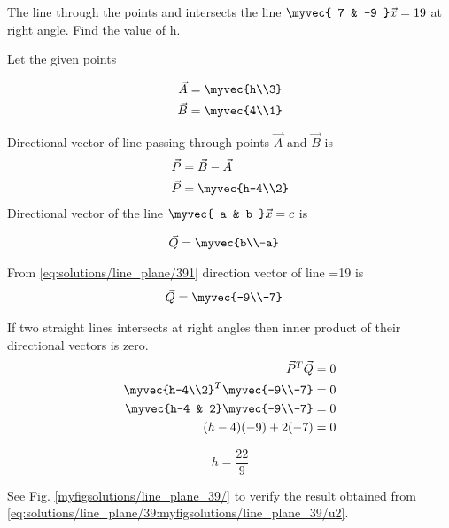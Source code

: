  The line through the points  and 
intersects the line $\myvec{ 7 & -9 }\vec{x}=19$ at right angle. Find the value of h.
%

Let the given points 

\begin{align}
    \vec{A} &= \myvec{h\\3}
    \\
    \vec{B} &= \myvec{4\\1}
\end{align}

Directional vector of line passing through points $\vec{A}$ and $\vec{B}$ is
\begin{align}
  \vec{P} &= \vec{B}-\vec{A}
  \\
  \vec{P} &= \myvec{h-4\\2}
\end{align}
 Directional vector of the line $\myvec{ a & b }\vec{x}=c$ is 

\begin{align}
  \vec{Q} &= \myvec{b\\-a}
  \label{eq:solutions/line_plane/391}
\end{align}

From \eqref{eq:solutions/line_plane/391} direction vector of
line =19 is
\begin{align}
  \vec{Q} &= \myvec{-9\\-7}
\end{align}

If two straight lines intersects at right angles then inner product of their directional vectors is zero.
\begin{align}
    \vec{P}^T\vec{Q}=0
    \\
    \myvec{h-4\\2}^T\myvec{-9\\-7}=0
    \\
    \myvec{h-4 & 2}\myvec{-9\\-7}=0
    \\
    (h-4)(-9)+2(-7)=0 
\end{align}

\begin{equation} \label{eq:solutions/line_plane/39u2}
    h=\dfrac{22}{9}
\end{equation}
   

See Fig. 	\ref{myfigsolutions/line_plane_39/}
to verify the result obtained from \eqref{eq:solutions/line_plane/39:myfigsolutions/line_plane_39/u2}.

